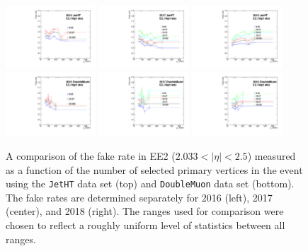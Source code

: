 \begin{figure}[!htbp]
\centering
\includegraphics[width=0.3\textwidth]{fig/compare_pv_EE2_2016_jetht.pdf}
\includegraphics[width=0.3\textwidth]{fig/compare_pv_EE2_2017_jetht.pdf}
\includegraphics[width=0.3\textwidth]{fig/compare_pv_EE2_2018_jetht.pdf}
\includegraphics[width=0.3\textwidth]{fig/compare_pv_EE2_2016_doublemuon.pdf}
\includegraphics[width=0.3\textwidth]{fig/compare_pv_EE2_2017_doublemuon.pdf}
\includegraphics[width=0.3\textwidth]{fig/compare_pv_EE2_2018_doublemuon.pdf}
\caption{A comparison of the fake rate in EE2 ($2.033 < \lvert \eta \rvert< 2.5$) measured as a function of the number of selected primary vertices in the event using the \texttt{JetHT} data set (top) and \texttt{DoubleMuon} data set (bottom). The fake rates are determined separately for 2016 (left), 2017 (center), and 2018 (right). The ranges used for comparison were chosen to reflect a roughly uniform level of statistics between all ranges.}
\label{fig:frpileup_EE2}
\end{figure}

